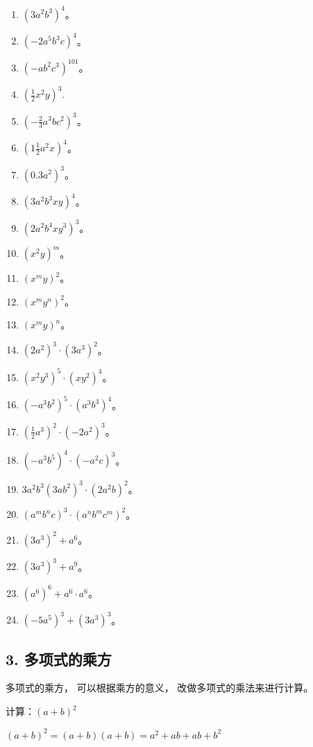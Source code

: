 \begin{enumerate}[start=1]
\item
  \((3a^{2}b^{3})^{4}\)。
\item
  \((-2a^{5}b^{3}c)^{4}\)。
\item
  \((-ab^{2}c^{3})^{101}\)。
\item
  \(\left(\frac{1}{2} x^2 y\right)^3.\)
\item
  \(\left(-\frac{2}{3} a^{3}b c^{2}\right)^{3}\)。
\item
  \(\left(1\frac{1}{2}a^{2}x\right)^{4}\)。
\item
  \((0.3a^{2})^{3}\)。
\item
  \((3a^{2}b^{3}xy)^{4}\)。
\item
  \((2a^{2}b^{4}xy^{3})^{3}\)。
\item
  \((x^{2}y)^{m}\)。
\item
  \((x^{m}y)^{2}\)。
\item
  \((x^{m}y^{n})^{2}\)。
\item
  \((x^{m}y)^{n}\)。
\item
  \((2a^{2})^{3} \cdot (3a^{3})^{2}\)。
\item
  \((x^{2}y^{3})^{5} \cdot (xy^{2})^{4}\)。
\item
  \((-a^3 b^2)^5 \cdot (a^3 b^3)^4\)。
\item
  \(\left(\frac{1}{2} a^3\right)^2 \cdot (-2a^2)^3\)。
\item
  \((-a^3 b^5)^4 \cdot (-a^2 c)^3\)。
\item
  \(3a^{2}b^{3}(3ab^{2})^{3}\cdot (2a^{2}b)^{2}\)。
\item
  \((a^{m}b^{n}c)^{3}\cdot (a^{n}b^{m}c^{m})^{2}\)。
\item
  \((3a^{3})^{2} + a^{6}\)。
\item
  \((3a^{3})^{3} + a^{9}\)。
\item
  \((a^6)^6 + a^6 \cdot a^6\)。
\item
  \((-5a^{5})^{3} + (3a^{3})^{3}\)。
\end{enumerate}

\subsection{3. 多项式的乘方}

多项式的乘方， 可以根据乘方的意义， 改做多项式的乘法来进行计算。

 计算：\((a + b)^{2}\)

\((a + b)^2 = (a + b)(a + b) = a^2 + ab + ab + b^2\)

